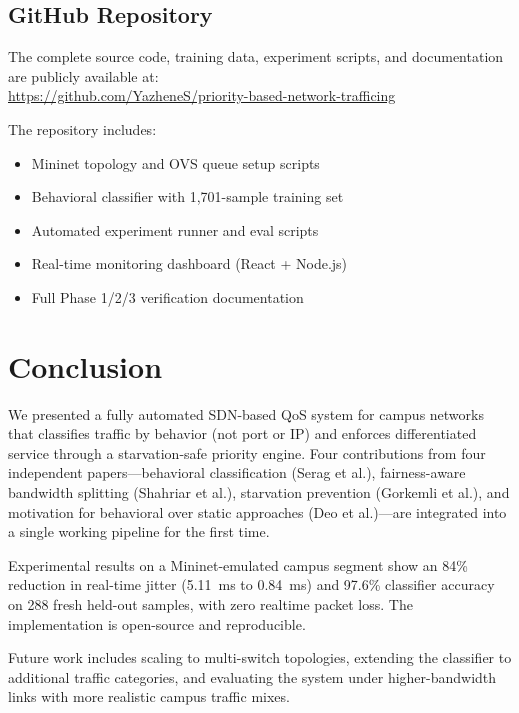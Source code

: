 \documentclass[conference]{IEEEtran}
\begin{document}
\subsection{GitHub Repository}

The complete source code, training data, experiment scripts, and
documentation are publicly available at:\\
\url{https://github.com/YazheneS/priority-based-network-trafficing}

The repository includes:
\begin{itemize}
  \item Mininet topology and OVS queue setup scripts
  \item Behavioral classifier with 1,701-sample training set
  \item Automated experiment runner and eval scripts
  \item Real-time monitoring dashboard (React + Node.js)
  \item Full Phase 1/2/3 verification documentation
\end{itemize}

\section{Conclusion}
\label{sec:conclusion}

We presented a fully automated SDN-based QoS system for campus
networks that classifies traffic by behavior (not port or IP) and
enforces differentiated service through a starvation-safe priority
engine. Four contributions from four independent papers—behavioral
classification (Serag et al.), fairness-aware bandwidth splitting
(Shahriar et al.), starvation prevention (Gorkemli et al.), and
motivation for behavioral over static approaches (Deo et al.)—are
integrated into a single working pipeline for the first time.

Experimental results on a Mininet-emulated campus segment show an
84\% reduction in real-time jitter (5.11~ms to 0.84~ms) and 97.6\%
classifier accuracy on 288 fresh held-out samples, with zero
realtime packet loss. The implementation is open-source and reproducible.

Future work includes scaling to multi-switch topologies, extending the
classifier to additional traffic categories, and evaluating the system
under higher-bandwidth links with more realistic campus traffic mixes.



\end{document}
